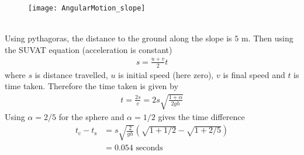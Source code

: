 \begin{hint}
{\begin{enumerate}
\begin{figure}[h] 
\centering
\texttt{[image: AngularMotion\_slope]}
\caption{}
\label{fig:AngularMotion_slope}
\end{figure}
\\
Using pythagoras, the distance to the ground along the slope is $5\textrm{ m}$. Then using the SUVAT equation (acceleration is constant)
\begin{align*}
s=\frac{u+v}{2}t
\end{align*}
where $s$ is distance travelled, $u$ is initial speed (here zero), $v$ is final speed and $t$ is time taken. Therefore the time taken is given by
\begin{align*}
t=\frac{2s}{v}=2s\sqrt{\frac{1+\alpha}{2gh}}
\end{align*}
Using $\alpha=2/5$ for the sphere and $\alpha=1/2$ gives the time difference
\begin{align*}
t_\textrm{c}-t_\textrm{s}&=s\sqrt{\frac{2}{gh}}\left(\sqrt{1+1/2}-\sqrt{1+2/5}\right) \\
&=0.054\textrm{ seconds}
\end{align*}
\end{enumerate}
}
\end{hint}